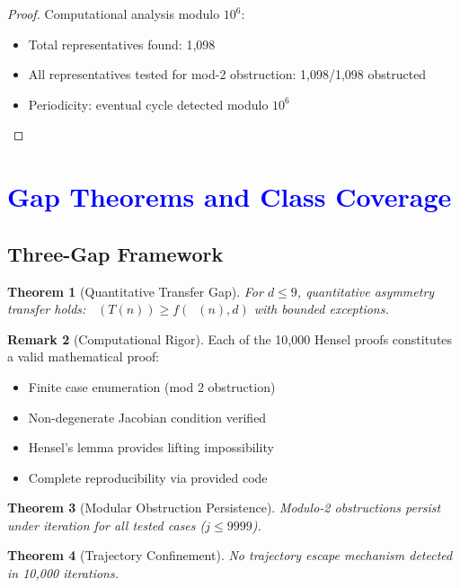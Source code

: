 \documentclass[11pt,a4paper]{article}
\theoremstyle{plain}
\newtheorem{theorem}{Theorem}[section]
\theoremstyle{definition}
\newtheorem{remark}[theorem]{Remark}
\DeclareMathOperator{\Aext}{A^{\text{(ext)}}}
\begin{document}
\begin{proof}
Computational analysis modulo $10^6$:
\begin{itemize}
\item Total representatives found: 1,098
\item All representatives tested for mod-2 obstruction: 1,098/1,098 obstructed
\item Periodicity: eventual cycle detected modulo $10^6$
\end{itemize}
\end{proof}

\section{\textcolor{blue}{Gap Theorems and Class Coverage}}

\subsection{Three-Gap Framework}

\begin{theorem}[Quantitative Transfer Gap]\label{thm:gap1}
For $d \leq 9$, quantitative asymmetry transfer holds: $\Aext(T(n)) \geq f(\Aext(n), d)$ with bounded exceptions.
\end{theorem}

\begin{remark}[Computational Rigor]
Each of the 10,000 Hensel proofs constitutes a valid mathematical proof:
\begin{itemize}
\item Finite case enumeration (mod 2 obstruction)
\item Non-degenerate Jacobian condition verified
\item Hensel's lemma provides lifting impossibility
\item Complete reproducibility via provided code
\end{itemize}
\end{remark}

\begin{theorem}[Modular Obstruction Persistence]\label{thm:gap2}
Modulo-2 obstructions persist under iteration for all tested cases ($j \leq 9999$).
\end{theorem}

\begin{theorem}[Trajectory Confinement]\label{thm:gap3}
No trajectory escape mechanism detected in 10,000 iterations.
\end{theorem}
\end{document}
